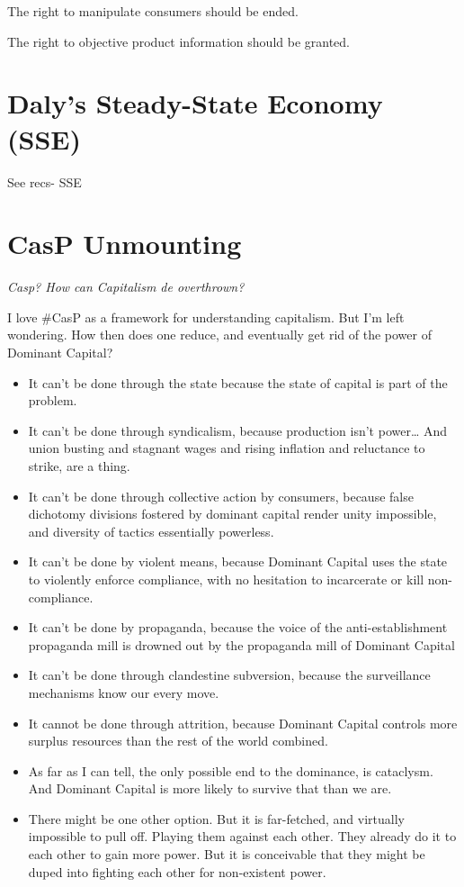 \documentclass[
]{book}
\begin{document}
The right to manipulate consumers should be ended.

The right to objective product information should be granted.

\hypertarget{dalys-steady-state-economy-sse}{%
\section{Daly's Steady-State Economy (SSE)}\label{dalys-steady-state-economy-sse}}

See recs- SSE

\hypertarget{casp-unmounting}{%
\section{CasP Unmounting}\label{casp-unmounting}}

\emph{Casp? How can Capitalism de overthrown?}

I love \#CasP as a framework for understanding capitalism.
But I'm left wondering. How then does one reduce, and eventually get rid of
the power of Dominant Capital?

\begin{itemize}
\item
  It can't be done through the state because the state of capital is part of the problem.
\item
  It can't be done through syndicalism, because production isn't power\ldots{} And union busting and stagnant wages and rising inflation and reluctance to strike, are a thing.
\item
  It can't be done through collective action by consumers, because false dichotomy divisions fostered by dominant capital render unity impossible, and diversity of tactics essentially powerless.
\item
  It can't be done by violent means, because Dominant Capital uses the state to violently enforce compliance, with no hesitation to incarcerate or kill non-compliance.
\item
  It can't be done by propaganda, because the voice of the anti-establishment propaganda mill is drowned out by the propaganda mill of Dominant Capital
\item
  It can't be done through clandestine subversion, because the surveillance mechanisms know our every move.
\item
  It cannot be done through attrition, because Dominant Capital controls more surplus resources than the rest of the world combined.
\item
  As far as I can tell, the only possible end to the dominance, is cataclysm. And Dominant Capital is more likely to survive that than we are.
\item
  There might be one other option. But it is far-fetched, and virtually impossible to pull off. Playing them against each other. They already do it to each other to gain more power. But it is conceivable that they might be duped into fighting each other for non-existent power.
\end{itemize}
\end{document}
